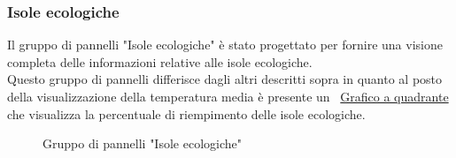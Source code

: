 \subsubsection{Isole ecologiche}
Il gruppo di pannelli "Isole ecologiche" è stato progettato per fornire una visione completa delle informazioni relative alle isole ecologiche.\\
Questo gruppo di pannelli differisce dagli altri descritti sopra in quanto al posto della visualizzazione della temperatura media è presente un ~\hyperlink{par:grafico_quadrante}{Grafico a quadrante} che visualizza la percentuale di riempimento delle isole ecologiche.\\
\begin{figure}[H]
    \centering
    \caption{Gruppo di pannelli "Isole ecologiche"}
    \label{fig:my_label}
\end{figure}



